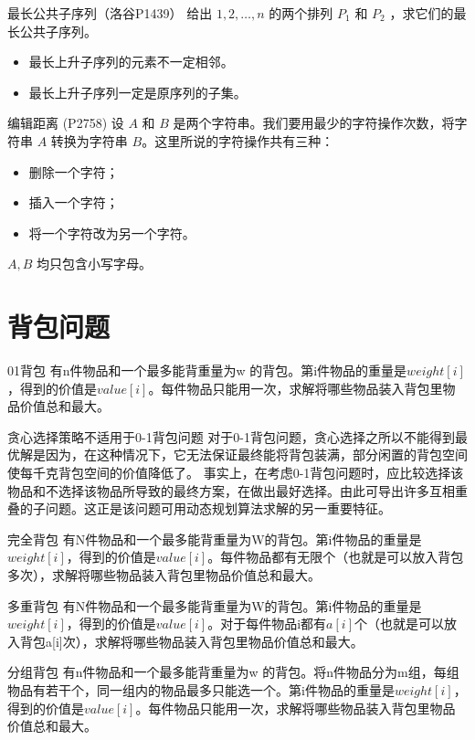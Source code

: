 \documentclass{beamer}
\begin{document}
\begin{frame}{最长公共子序列（洛谷P1439）}
    给出 $1,2,\ldots,n$ 的两个排列 $P_1$ 和 $P_2$ ，求它们的最长公共子序列。
    \begin{itemize}
        \item 最长上升子序列的元素不一定相邻。
        \item 最长上升子序列一定是原序列的子集。
    \end{itemize}
\end{frame}

\begin{frame}{编辑距离 (P2758)}
    设 $A$ 和 $B$ 是两个字符串。我们要用最少的字符操作次数，将字符串 $A$ 转换为字符串 $B$。这里所说的字符操作共有三种：
    \begin{itemize}
        \item 删除一个字符；
        \item 插入一个字符；
        \item 将一个字符改为另一个字符。
    \end{itemize}
    $A, B$ 均只包含小写字母。
\end{frame}

\section{背包问题}

\begin{frame}{01背包}
    有n件物品和一个最多能背重量为w 的背包。第i件物品的重量是$weight[i]$，得到的价值是$value[i]$。每件物品只能用一次，求解将哪些物品装入背包里物品价值总和最大。
\end{frame}

\begin{frame}{贪心选择策略不适用于0-1背包问题}
    对于0-1背包问题，贪心选择之所以不能得到最优解是因为，在这种情况下，它无法保证最终能将背包装满，部分闲置的背包空间使每千克背包空间的价值降低了。 事实上，在考虑0-1背包问题时，应比较选择该物品和不选择该物品所导致的最终方案，在做出最好选择。由此可导出许多互相重叠的子问题。这正是该问题可用动态规划算法求解的另一重要特征。
\end{frame}

\begin{frame}{完全背包}
    有N件物品和一个最多能背重量为W的背包。第i件物品的重量是$weight[i]$，得到的价值是$value[i]$。每件物品都有无限个（也就是可以放入背包多次），求解将哪些物品装入背包里物品价值总和最大。
\end{frame}

\begin{frame}{多重背包}
    有N件物品和一个最多能背重量为W的背包。第i件物品的重量是$weight[i]$，得到的价值是$value[i]$。对于每件物品i都有$a[i]$个（也就是可以放入背包a[i]次），求解将哪些物品装入背包里物品价值总和最大。
\end{frame}

\begin{frame}{分组背包}
    有n件物品和一个最多能背重量为w 的背包。将n件物品分为m组，每组物品有若干个，同一组内的物品最多只能选一个。第i件物品的重量是$weight[i]$，得到的价值是$value[i]$。每件物品只能用一次，求解将哪些物品装入背包里物品价值总和最大。
\end{frame}
\end{document}
